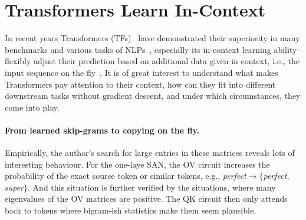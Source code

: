 \section{Transformers Learn In-Context}
In recent years Transformers (TFs)~\cite{} have demonstrated their superiority in many benchmarks and various tasks of NLPs~\cite{}, especially its in-context learning ability--flexibly adjust their prediction based on
additional data given in context, i.e., the input sequence on the fly~\cite{von2023transformers}. It is of great interest to understand what makes Transformers pay attention to their context, how can they fit into different downstream tasks without gradient descent, and under which circumstances, they come into play.


\paragraph{From learned skip-grams to copying on the fly.} Empirically, the author's search for large entries in these matrices reveals lots of interesting behaviour. For the one-laye SAN, the OV circuit increases the probability of the exact source token or similar tokens, e.g., \textit{perfect}$\rightarrow\{$\textit{perfect}, \textit{super}$\}$. And this situation is further verified by the situations, where many eigenvalues of the OV matrices are positive. The QK circuit then only attends back to tokens where bigram-ish statistics make them seem plausible. 

